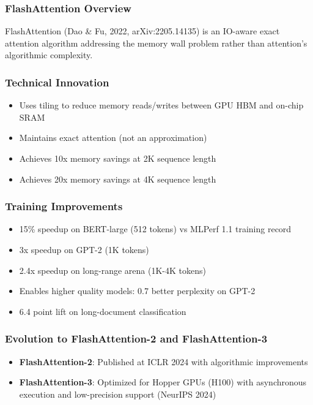 \documentclass[11pt,letterpaper]{article}
\begin{document}
\subsubsection{FlashAttention Overview}
FlashAttention (Dao \& Fu, 2022, arXiv:2205.14135) is an IO-aware exact attention algorithm addressing the memory wall problem rather than attention's algorithmic complexity.

\subsubsection{Technical Innovation}
\begin{itemize}[leftmargin=*]
    \item Uses tiling to reduce memory reads/writes between GPU HBM and on-chip SRAM
    \item Maintains exact attention (not an approximation)
    \item Achieves 10x memory savings at 2K sequence length
    \item Achieves 20x memory savings at 4K sequence length
\end{itemize}

\subsubsection{Training Improvements}
\begin{itemize}[leftmargin=*]
    \item 15\% speedup on BERT-large (512 tokens) vs MLPerf 1.1 training record
    \item 3x speedup on GPT-2 (1K tokens)
    \item 2.4x speedup on long-range arena (1K-4K tokens)
    \item Enables higher quality models: 0.7 better perplexity on GPT-2
    \item 6.4 point lift on long-document classification
\end{itemize}

\subsubsection{Evolution to FlashAttention-2 and FlashAttention-3}
\begin{itemize}[leftmargin=*]
    \item \textbf{FlashAttention-2}: Published at ICLR 2024 with algorithmic improvements
    \item \textbf{FlashAttention-3}: Optimized for Hopper GPUs (H100) with asynchronous execution and low-precision support (NeurIPS 2024)
\end{itemize}
\end{document}
